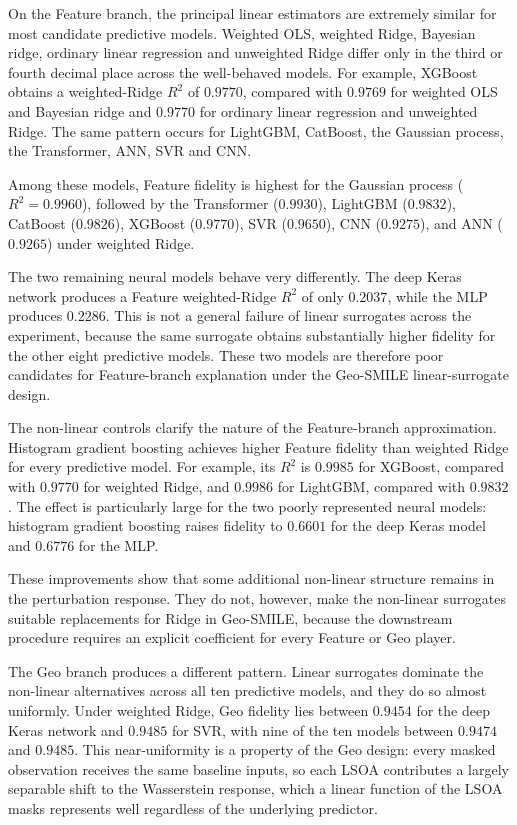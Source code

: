 On the Feature branch, the principal linear estimators are extremely similar for most candidate predictive models. Weighted OLS, weighted Ridge, Bayesian ridge, ordinary linear regression and unweighted Ridge differ only in the third or fourth decimal place across the well-behaved models. For example, XGBoost obtains a weighted-Ridge $R^2$ of $0.9770$, compared with $0.9769$ for weighted OLS and Bayesian ridge and $0.9770$ for ordinary linear regression and unweighted Ridge. The same pattern occurs for LightGBM, CatBoost, the Gaussian process, the Transformer, ANN, SVR and CNN.

Among these models, Feature fidelity is highest for the Gaussian process ($R^2=0.9960$), followed by the Transformer ($0.9930$), LightGBM ($0.9832$), CatBoost ($0.9826$), XGBoost ($0.9770$), SVR ($0.9650$), CNN ($0.9275$), and ANN ($0.9265$) under weighted Ridge.

The two remaining neural models behave very differently. The deep Keras network produces a Feature weighted-Ridge $R^2$ of only $0.2037$, while the MLP produces $0.2286$. This is not a general failure of linear surrogates across the experiment, because the same surrogate obtains substantially higher fidelity for the other eight predictive models. These two models are therefore poor candidates for Feature-branch explanation under the Geo-SMILE linear-surrogate design.

The non-linear controls clarify the nature of the Feature-branch approximation. Histogram gradient boosting achieves higher Feature fidelity than weighted Ridge for every predictive model. For example, its $R^2$ is $0.9985$ for XGBoost, compared with $0.9770$ for weighted Ridge, and $0.9986$ for LightGBM, compared with $0.9832$. The effect is particularly large for the two poorly represented neural models: histogram gradient boosting raises fidelity to $0.6601$ for the deep Keras model and $0.6776$ for the MLP.

These improvements show that some additional non-linear structure remains in the perturbation response. They do not, however, make the non-linear surrogates suitable replacements for Ridge in Geo-SMILE, because the downstream procedure requires an explicit coefficient for every Feature or Geo player.

The Geo branch produces a different pattern. Linear surrogates dominate the non-linear alternatives across all ten predictive models, and they do so almost uniformly. Under weighted Ridge, Geo fidelity lies between $0.9454$ for the deep Keras network and $0.9485$ for SVR, with nine of the ten models between $0.9474$ and $0.9485$. This near-uniformity is a property of the Geo design: every masked observation receives the same baseline inputs, so each LSOA contributes a largely separable shift to the Wasserstein response, which a linear function of the LSOA masks represents well regardless of the underlying predictor.

